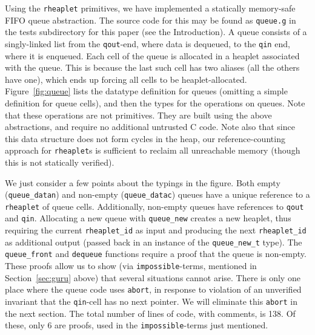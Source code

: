 \documentclass[9pt,natbib]{sigplanconf}
\begin{document}
Using the \texttt{rheaplet} primitives, we have implemented a
statically memory-safe FIFO queue abstraction.  The source code for
this may be found as \texttt{queue.g} in the tests subdirectory for
this paper (see the Introduction).  A queue consists of a
singly-linked list from the \texttt{qout}-end, where data is dequeued,
to the \texttt{qin} end, where it is enqueued.  Each cell of the queue
is allocated in a heaplet associated with the queue.  This is because
the last such cell has two aliases (all the others have one), which
ends up forcing all cells to be heaplet-allocated.
Figure~\ref{fig:queue} lists the datatype definition for queues
(omitting a simple definition for queue cells), and then the types for
the operations on queues.  Note that these operations are not
primitives.  They are built using the above abstractions, and require
no additional untrusted C code.  Note also that since this data
structure does not form cycles in the heap, our reference-counting
approach for \texttt{rheaplet}s is sufficient to reclaim all
unreachable memory (though this is not statically verified).

We just consider a few points about the typings in the figure.  Both
empty (\texttt{queue\_datan}) and non-empty (\texttt{queue\_datac})
queues have a unique reference to a \texttt{rheaplet} of queue cells.
Additionally, non-empty queues have references to \texttt{qout} and
\texttt{qin}.  Allocating a new queue with \texttt{queue\_new} creates
a new heaplet, thus requiring the current \texttt{rheaplet\_id} as
input and producing the next \texttt{rheaplet\_id} as additional
output (passed back in an instance of the \texttt{queue\_new\_t}
type).  The \texttt{queue\_front} and \texttt{dequeue} functions
require a proof that the queue is non-empty.  These proofs allow us to
show (via \texttt{impossible}-terms, mentioned in
Section~\ref{sec:guru} above) that several situations cannot arise.
There is only one place where the queue code uses \texttt{abort}, in
response to violation of an unverified invariant that the
\texttt{qin}-cell has no next pointer.  We will eliminate this
\texttt{abort} in the next section.  The total number of lines of
code, with comments, is 138.  Of these, only 6 are proofs, used in the
\texttt{impossible}-terms just mentioned.
\end{document}
